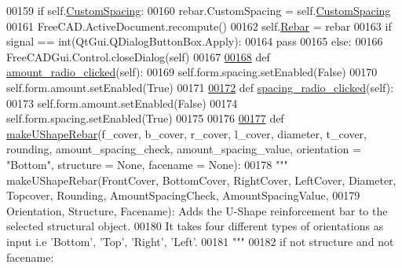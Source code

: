 \begin{DoxyCode}
00159         \textcolor{keywordflow}{if} self.\hyperlink{classUShapeRebar_1_1__UShapeRebarTaskPanel_abb7e05e650f1e52e878b0d74be1c9abd}{CustomSpacing}:
00160             rebar.CustomSpacing = self.\hyperlink{classUShapeRebar_1_1__UShapeRebarTaskPanel_abb7e05e650f1e52e878b0d74be1c9abd}{CustomSpacing}
00161             FreeCAD.ActiveDocument.recompute()
00162         self.\hyperlink{classUShapeRebar_1_1__UShapeRebarTaskPanel_a01238597180da20c197d4c02925814f6}{Rebar} = rebar
00163         \textcolor{keywordflow}{if} signal == int(QtGui.QDialogButtonBox.Apply):
00164             \textcolor{keywordflow}{pass}
00165         \textcolor{keywordflow}{else}:
00166             FreeCADGui.Control.closeDialog(self)
00167 
\hypertarget{UShapeRebar_8py_source.tex_l00168}{}\hyperlink{classUShapeRebar_1_1__UShapeRebarTaskPanel_a413995e1628847d66ad62ce177242c51}{00168}     \textcolor{keyword}{def }\hyperlink{classUShapeRebar_1_1__UShapeRebarTaskPanel_a413995e1628847d66ad62ce177242c51}{amount\_radio\_clicked}(self):
00169         self.form.spacing.setEnabled(\textcolor{keyword}{False})
00170         self.form.amount.setEnabled(\textcolor{keyword}{True})
00171 
\hypertarget{UShapeRebar_8py_source.tex_l00172}{}\hyperlink{classUShapeRebar_1_1__UShapeRebarTaskPanel_a6c7a6e22e7d3f9233bf199561beb58b1}{00172}     \textcolor{keyword}{def }\hyperlink{classUShapeRebar_1_1__UShapeRebarTaskPanel_a6c7a6e22e7d3f9233bf199561beb58b1}{spacing\_radio\_clicked}(self):
00173         self.form.amount.setEnabled(\textcolor{keyword}{False})
00174         self.form.spacing.setEnabled(\textcolor{keyword}{True})
00175 
00176 
\hypertarget{UShapeRebar_8py_source.tex_l00177}{}\hyperlink{namespaceUShapeRebar_adb9f6e4b9ec41d7a1fdfe58ad174fec3}{00177} \textcolor{keyword}{def }\hyperlink{namespaceUShapeRebar_adb9f6e4b9ec41d7a1fdfe58ad174fec3}{makeUShapeRebar}(f\_cover, b\_cover, r\_cover, l\_cover, diameter, t\_cover, rounding, 
      amount\_spacing\_check, amount\_spacing\_value, orientation = "Bottom", structure = None, facename = None):
00178     \textcolor{stringliteral}{""" makeUShapeRebar(FrontCover, BottomCover, RightCover, LeftCover, Diameter, Topcover, Rounding,
       AmountSpacingCheck, AmountSpacingValue,}
00179 \textcolor{stringliteral}{    Orientation, Structure, Facename): Adds the U-Shape reinforcement bar to the selected structural
       object.}
00180 \textcolor{stringliteral}{    It takes four different types of orientations as input i.e 'Bottom', 'Top', 'Right', 'Left'.}
00181 \textcolor{stringliteral}{    """}
00182     \textcolor{keywordflow}{if} \textcolor{keywordflow}{not} structure \textcolor{keywordflow}{and} \textcolor{keywordflow}{not} facename:

\end{DoxyCode}

